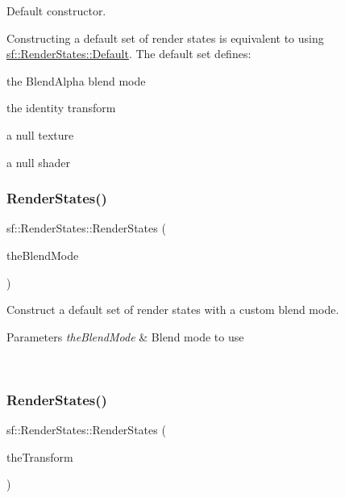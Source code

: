 Default constructor. 

Constructing a default set of render states is equivalent to using \mbox{\hyperlink{classsf_1_1_render_states_ad29672df29f19ce50c3021d95f2bb062}{sf\+::\+Render\+States\+::\+Default}}. The default set defines\+: \begin{DoxyItemize}
\item the Blend\+Alpha blend mode \item the identity transform \item a null texture \item a null shader \begin{DoxyVerb}\end{DoxyVerb}
 \end{DoxyItemize}
\mbox{\label{classsf_1_1_render_states_acac8830a593c8a4523ac2fdf3cac8a01}} 
\subsubsection{\texorpdfstring{RenderStates()}{RenderStates()}\hspace{0.1cm}{\footnotesize\ttfamily [2/6]}}
{\footnotesize\ttfamily sf\+::\+Render\+States\+::\+Render\+States (\begin{DoxyParamCaption}\item[{const \mbox{\hyperlink{structsf_1_1_blend_mode}{Blend\+Mode}} \&}]{the\+Blend\+Mode }\end{DoxyParamCaption})}



Construct a default set of render states with a custom blend mode. 


\begin{DoxyParams}{Parameters}
{\em the\+Blend\+Mode} & Blend mode to use \begin{DoxyVerb}\end{DoxyVerb}
 \\
\hline
\end{DoxyParams}
\mbox{\label{classsf_1_1_render_states_a3e99cad6ab05971d40357949930ed890}} 
\subsubsection{\texorpdfstring{RenderStates()}{RenderStates()}\hspace{0.1cm}{\footnotesize\ttfamily [3/6]}}
{\footnotesize\ttfamily sf\+::\+Render\+States\+::\+Render\+States (\begin{DoxyParamCaption}\item[{const \mbox{\hyperlink{classsf_1_1_transform}{Transform}} \&}]{the\+Transform }\end{DoxyParamCaption})}



